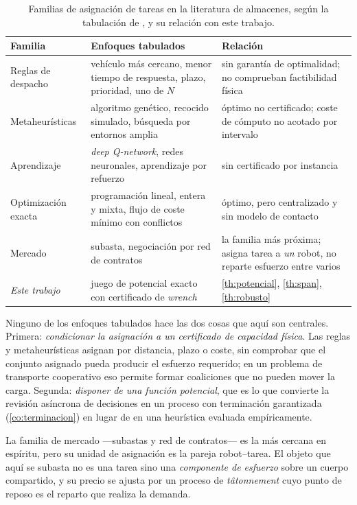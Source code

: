 \begin{table}[!ht]
\centering\small
\caption{Familias de asignación de tareas en la literatura de almacenes, según
la tabulación de \cite{yildirim2023warehouse}, y su relación con este trabajo.}
\label{tab:asignacion-lit}
\begin{tabularx}{\textwidth}{@{}p{2.7cm}p{4.5cm}X@{}}
\toprule
Familia & Enfoques tabulados & Relación \\
\midrule
Reglas de despacho
  & vehículo más cercano, menor tiempo de respuesta, plazo, prioridad,
    uno de $N$
  & sin garantía de optimalidad; no comprueban factibilidad física \\
Metaheurísticas
  & algoritmo genético, recocido simulado, búsqueda por entornos amplia
  & óptimo no certificado; coste de cómputo no acotado por intervalo \\
Aprendizaje
  & \emph{deep Q-network}, redes neuronales, aprendizaje por refuerzo
  & sin certificado por instancia \\
Optimización exacta
  & programación lineal, entera y mixta, flujo de coste mínimo con conflictos
  & óptimo, pero centralizado y sin modelo de contacto \\
Mercado
  & subasta, negociación por red de contratos
  & la familia más próxima; asigna tarea a \emph{un} robot, no reparte
    esfuerzo entre varios \\
\midrule
\emph{Este trabajo}
  & juego de potencial exacto con certificado de \emph{wrench}
  & \cref{th:potencial}, \cref{th:span}, \cref{th:robusto} \\
\bottomrule
\end{tabularx}
\end{table}

\begin{observacion}
\label{obs:hueco-literatura}
Ninguno de los enfoques tabulados hace las dos cosas que aquí son centrales.
Primera: \emph{condicionar la asignación a un certificado de capacidad física}.
Las reglas y metaheurísticas asignan por distancia, plazo o coste, sin comprobar
que el conjunto asignado pueda producir el esfuerzo requerido; en un problema de
transporte cooperativo eso permite formar coaliciones que no pueden mover la
carga. Segunda: \emph{disponer de una función potencial}, que es lo que convierte
la revisión asíncrona de decisiones en un proceso con terminación garantizada
(\cref{co:terminacion}) en lugar de en una heurística evaluada empíricamente.

La familia de mercado —subastas y red de contratos— es la más cercana en
espíritu, pero su unidad de asignación es la pareja robot--tarea. El objeto que
aquí se subasta no es una tarea sino una \emph{componente de esfuerzo} sobre un
cuerpo compartido, y su precio se ajusta por un proceso de \emph{tâtonnement}
cuyo punto de reposo es el reparto que realiza la demanda.
\end{observacion}

